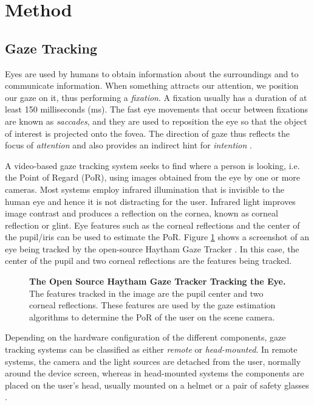\documentclass[jou,a4paper,notxfonts]{apa}
\begin{document}
\section{Method}

\subsection{Gaze Tracking}
Eyes are used by humans to obtain information about the surroundings and to communicate information. When something
attracts our attention, we position our gaze on it, thus performing a \textit{fixation}. A fixation usually has a
duration of at least 150 milliseconds (ms). The fast eye movements that occur between fixations are known as
\textit{saccades}, and they are used to reposition the eye so that the object of interest is projected onto the fovea.
The direction of gaze thus reflects the focus of \textit{attention} and also provides an indirect hint for
\textit{intention} \cite{velichkovsky}.


A video-based gaze tracking system seeks to find where a person is looking, i.e. the Point of Regard (PoR), using images
obtained from the eye by one or more cameras. Most systems employ infrared illumination that is invisible to the human
eye and hence it is not distracting for the user. Infrared light improves image contrast and produces a reflection on
the cornea, known as corneal reflection or glint. Eye features such as the corneal reflections and the center of the
pupil/iris can be used to estimate the PoR. Figure \ref{screenGazeTracker} shows a screenshot of an eye being tracked by
the open-source Haytham Gaze Tracker \cite{mardanbegi2012eye}. In this case, the center of the pupil and two
corneal reflections are the features being tracked.

\begin{figure}[tp]
 \caption{\textbf{The Open Source Haytham Gaze Tracker Tracking the Eye.} The
features tracked in the image are the pupil center and two corneal reflections. These features are 
used by the gaze estimation algorithms to determine the PoR of the user on the scene camera.}
 \label{screenGazeTracker}
\end{figure}

Depending on the hardware configuration of the different components, gaze tracking systems can be classified as either
\textit{remote} or \textit{head-mounted}. In remote systems, the camera and the light sources are detached from the
user, normally around the device screen, whereas in head-mounted systems the components are placed on the user's head, usually
mounted on a helmet or a pair of safety glasses \cite{lowcostitugazetracker}.
\end{document}

